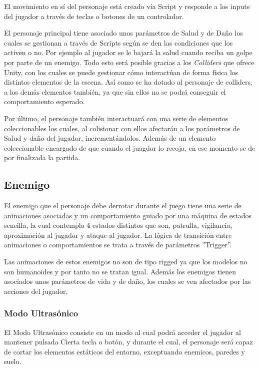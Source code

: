 El movimiento en sí del personaje está creado vía Script y responde a los inputs del jugador a través de teclas o botones de un controlador.

El personaje principal tiene asociado unos parámetros de Salud y de Daño los cuales se gestionan a través de Scripts según se den las condiciones que los activen o no. Por ejemplo al jugador se le bajará la salud cuando reciba un golpe por parte de un enemigo. Todo esto será posible gracias a los \textit{Colliders} que ofrece Unity, con los cuales se puede gestionar cómo interactúan de forma física los distintos elementos de la escena. Así como se ha dotado al personaje de colliders, a los demás elementos también, ya que sin ellos no se podrá conseguir el comportamiento esperado.

Por último, el personaje también interactuará con una serie de elementos coleccionables los cuales, al colisionar con ellos afectarán a los parámetros de Salud y daño del jugador, incrementándolos. Además de un elemento coleccionable encargado de que cuando el juagdor lo recoja, en ese momento se de por finalizada la partida.

\subsection{Enemigo}

El enemigo que el personaje debe derrotar durante el juego tiene una serie de animaciones asociadas y un comportamiento guiado por una máquina de estados sencilla, la cual contempla 4 estados distintos que son, patrulla, vigilancia, aproximación al jugador y ataque al jugador. La lógica de transición entre animaciones o comportamientos se trata a través de parámetros ''Trigger''. 

Las animaciones de estos enemigos no son de tipo rigged ya que los modelos no son humanoides y por tanto no se tratan igual. Además los enemigos tienen asociados unos parámetros de vida y de daño, los cuales se ven afectados por las acciones del jugador.

\subsubsection{Modo Ultrasónico}

El Modo Ultrasónico consiste en un modo al cual podrá acceder el jugador al mantener pulsada Cierta tecla o botón, y durante el cual, el personaje será capaz de cortar los elementos estáticos del entorno, exceptuando enemicos, paredes y suelo. 

